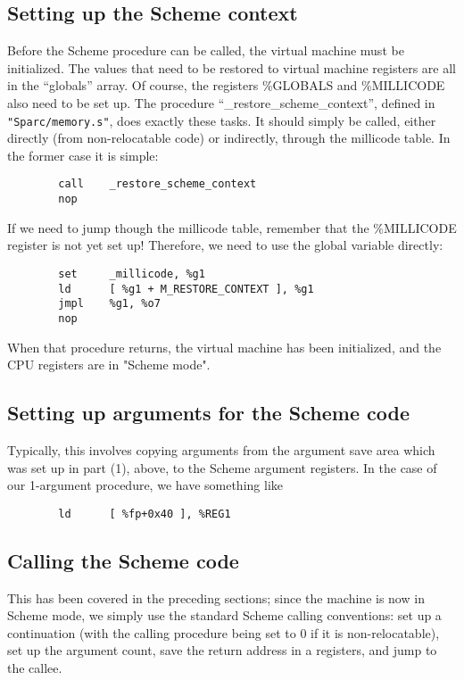 \subsection{Setting up the Scheme context}

Before the Scheme procedure can be called, the virtual machine must be
initialized. The values that need to be restored to virtual machine
registers are all in the ``globals'' array. Of course, the registers
\%GLOBALS and \%MILLICODE also need to be set up.  The procedure
``\_restore\_scheme\_context'', defined in \verb+"Sparc/memory.s"+,
does exactly these tasks. It should simply be called, either directly
(from non-relocatable code) or indirectly, through the millicode
table. In the former case it is simple:

\begin{verbatim}
        call    _restore_scheme_context
        nop
\end{verbatim}

If we need to jump though the millicode table, remember that the \%MILLICODE
register is not yet set up! Therefore, we need to use the global variable
directly:

\begin{verbatim}
        set     _millicode, %g1
        ld      [ %g1 + M_RESTORE_CONTEXT ], %g1
        jmpl    %g1, %o7
        nop
\end{verbatim}

When that procedure returns, the virtual machine has been initialized, and
the CPU registers are in "Scheme mode".

\subsection{Setting up arguments for the Scheme code}

Typically, this involves copying arguments from the argument save area which
was set up in part (1), above, to the Scheme argument registers. In the case
of our 1-argument procedure, we have something like

\begin{verbatim}
        ld      [ %fp+0x40 ], %REG1
\end{verbatim}

\subsection{Calling the Scheme code}

This has been covered in the preceding sections; since the machine is
now in Scheme mode, we simply use the standard Scheme calling
conventions: set up a continuation (with the calling procedure being
set to 0 if it is non-relocatable), set up the argument count, save the
return address in a registers, and jump to the callee.

